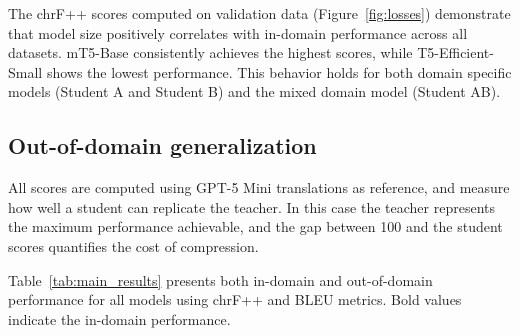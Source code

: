\documentclass[pdflatex,sn-mathphys-num]{sn-jnl}%
\theoremstyle{thmstyleone}%
\theoremstyle{thmstyletwo}%
\theoremstyle{thmstylethree}%
\begin{document}
The chrF++ scores computed on validation data (Figure~\ref{fig:losses}) demonstrate that model size positively correlates with in-domain performance across all datasets. mT5-Base consistently achieves the highest scores, while T5-Efficient-Small shows the lowest performance. This behavior holds for both domain specific models (Student A and Student B) and the mixed domain model (Student AB).

\subsection{Out-of-domain generalization}

All scores are computed using GPT-5 Mini translations as reference, and measure how well a student can replicate the teacher. In this case the teacher represents the maximum performance achievable, and the gap between 100 and the student scores quantifies the cost of compression.

Table~\ref{tab:main_results} presents both in-domain and out-of-domain performance for all models using chrF++ and BLEU metrics. Bold values indicate the in-domain performance.
\end{document}
